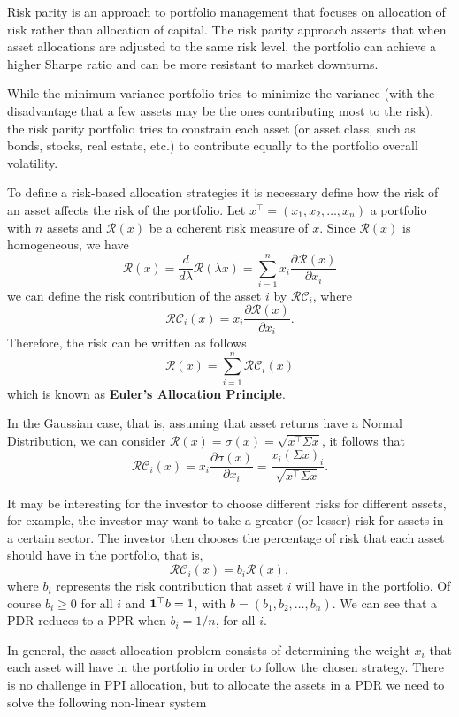 Risk parity is an approach to portfolio management that focuses on allocation of risk rather than allocation of capital. The risk parity approach asserts that when asset allocations are adjusted to the same risk level, the portfolio can achieve a higher Sharpe ratio and can be more resistant to market downturns.

While the minimum variance portfolio tries to minimize the variance (with the disadvantage that a few assets may be the ones contributing most to the risk), the risk parity portfolio tries to constrain each asset (or asset class, such as bonds, stocks, real estate, etc.) to contribute equally to the portfolio overall volatility.

To define a risk-based allocation strategies it is necessary define how the risk of an asset affects the risk of the portfolio. 
Let $x^\top=(x_1,x_2,\dots,x_n)$ a portfolio with $n$ assets and $\mathcal{R}(x)$ be a coherent risk measure of $x$. Since $\mathcal{R}(x)$ is homogeneous, we have
\[
\mathcal{R}(x)=\frac{d}{d\lambda}\mathcal{R}(\lambda x)=\sum_{i=1}^n x_i \frac{\partial \mathcal{R} (x)}{\partial x_i}
\]
we can define the risk contribution of the asset $i$ by
$\mathcal{RC}_i$, where
\[
\mathcal{RC}_i(x)= x_i \frac{\partial \mathcal{R}(x)}{\partial x_i}.
\]
Therefore, the risk can be written as follows
\[
\mathcal{R}(x)=\sum_{i=1}^n \mathcal{RC}_i(x)
\]
which is known as \textbf{Euler's Allocation Principle}.

In the Gaussian case, that is, assuming that asset returns
have a Normal Distribution, we can consider
$\mathcal{R}(x)=\sigma(x)=\sqrt{x^\top\Sigma x}$, it follows that
\[
\mathcal{RC}_i(x)= x_i \frac{\partial \sigma(x)}{\partial x_i}=\frac{x_i (\Sigma x)_i}{\sqrt{x^\top\Sigma x }}.
\]

It may be interesting for the investor to choose different risks for different assets, for example, the investor may want to take a greater (or lesser) risk for assets in a certain sector. The investor then chooses the percentage of risk that each asset should have in the portfolio, that is,
\[
\mathcal{RC}_i(x)=b_i\mathcal{R}(x),
\]
where $b_i$ represents the risk contribution that asset $i$ will have in the portfolio. Of course $b_i\geq 0$ for all $i$ and
${\bf 1}^\top b =1$, with $b=(b_1, b_2, \dots, b_n)$. We can see that a PDR reduces to a PPR when $b_i=1/n$, for all $i$.

In general, the asset allocation problem consists of determining the weight $x_i$ that each asset will have in the portfolio in order to follow the chosen strategy. There is no challenge in PPI allocation, but to allocate the assets in a PDR we need to solve the following non-linear system

